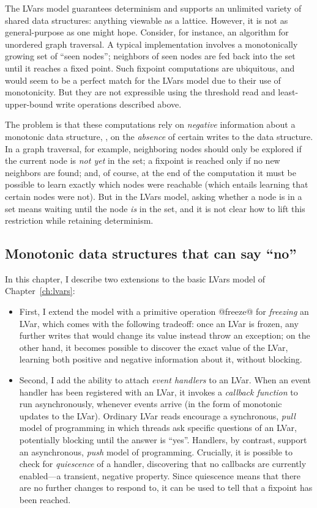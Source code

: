 The LVars model guarantees determinism and supports an unlimited
variety of shared data structures: anything viewable as a lattice.
However, it is not as general-purpose as one might hope.  Consider,
for instance, an algorithm for unordered graph traversal.  A typical
implementation involves a monotonically growing set of ``seen nodes'';
neighbors of seen nodes are fed back into the set until it reaches a
fixed point.  Such fixpoint computations are ubiquitous, and would
seem to be a perfect match for the LVars model due to their use of
monotonicity.  But they are not expressible using the threshold read
and least-upper-bound write operations described above.

The problem is that these computations rely on \emph{negative}
information about a monotonic data structure, \ie, on the
\emph{absence} of certain writes to the data structure.  In a graph
traversal, for example, neighboring nodes should only be explored if
the current node is \emph{not yet} in the set; a fixpoint is reached
only if no new neighbors are found; and, of course, at the end of the
computation it must be possible to learn exactly which nodes were
reachable (which entails learning that certain nodes were not).  But
in the LVars model, asking whether a node is in a set means waiting
until the node \emph{is} in the set, and it is not clear how to lift
this restriction while retaining determinism.

\subsection{Monotonic data structures that can say ``no''}

In this chapter, I describe two extensions to the basic LVars model of
Chapter~\ref{ch:lvars}:

\begin{itemize}
\item First, I extend the model with a primitive operation @freeze@
  for \emph{freezing} an LVar, which comes with the following
  tradeoff: once an LVar is frozen, any further writes that would
  change its value instead throw an exception; on the other hand, it
  becomes possible to discover the exact value of the LVar, learning
  both positive and negative information about it, without blocking.
\item
  Second, I add the ability to attach \emph{event handlers} to an
  LVar.  When an event handler has been registered with an LVar, it
  invokes a \emph{callback function} to run asynchronously, whenever
  events arrive (in the form of monotonic updates to the LVar).
  Ordinary LVar reads encourage a synchronous, \emph{pull} model of
  programming in which threads ask specific questions of an LVar,
  potentially blocking until the answer is ``yes''.  Handlers, by
  contrast, support an asynchronous, \emph{push} model of programming.
  Crucially, it is possible to check for \emph{quiescence} of a
  handler, discovering that no callbacks are currently enabled---a
  transient, negative property.  Since quiescence means that there are
  no further changes to respond to, it can be used to tell that a
  fixpoint has been reached.
\end{itemize}

